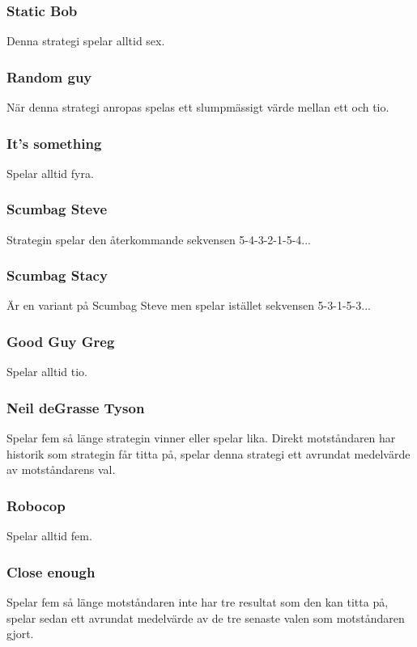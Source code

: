 \subsubsection{Static Bob}
Denna strategi spelar alltid sex.

\subsubsection{Random guy}
När denna strategi anropas spelas ett slumpmässigt värde mellan ett och tio.

\subsubsection{It’s something}
Spelar alltid fyra.

\subsubsection{Scumbag Steve}
Strategin spelar den återkommande sekvensen 5-4-3-2-1-5-4...

\subsubsection{Scumbag Stacy}
Är en variant på Scumbag Steve men spelar istället sekvensen 5-3-1-5-3...

\subsubsection{Good Guy Greg}
Spelar alltid tio.

\subsubsection{Neil deGrasse Tyson}
Spelar fem så länge strategin vinner eller spelar lika. Direkt motståndaren har historik som strategin får titta på, spelar denna strategi ett avrundat medelvärde av motståndarens val.

\subsubsection{Robocop}
Spelar alltid fem.

\subsubsection{Close enough}
Spelar fem så länge motståndaren inte har tre resultat som den kan titta på, spelar sedan ett avrundat medelvärde av de tre senaste valen som motståndaren gjort.

